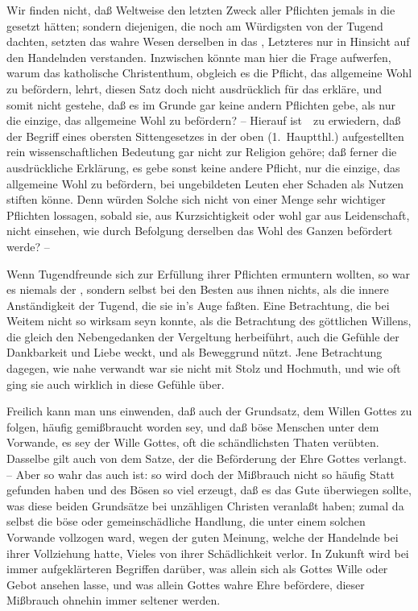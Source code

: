 \begin{aufza}
\item Wir finden nicht, daß  Weltweise den letzten Zweck aller Pflichten jemals in die  gesetzt hätten; sondern diejenigen, die noch am Würdigsten von der Tugend dachten, setzten das wahre Wesen derselben in das , Letzteres nur in Hinsicht auf den Handelnden verstanden. Inzwischen könnte man hier die Frage aufwerfen, warum das katholische Christenthum, obgleich es die Pflicht, das allgemeine Wohl zu befördern, lehrt, diesen Satz doch nicht ausdrücklich für das  erkläre, und somit nicht gestehe, daß es im Grunde gar keine andern Pflichten gebe, als nur die einzige, das allgemeine Wohl zu befördern? -- Hierauf ist~\ zu erwiedern, daß der Begriff eines obersten Sittengesetzes in der oben (1.~Hauptthl.) aufgestellten rein wissenschaftlichen Bedeutung gar nicht zur Religion gehöre; daß ferner die ausdrückliche Erklärung, es gebe sonst keine andere Pflicht, nur die einzige, das allgemeine Wohl zu befördern, bei ungebildeten Leuten eher Schaden als Nutzen stiften könne. Denn würden Solche sich nicht von einer Menge sehr wichtiger Pflichten lossagen, sobald sie, aus Kurzsichtigkeit oder wohl gar aus Leidenschaft, nicht einsehen, wie durch Befolgung derselben das Wohl des Ganzen befördert werde? --
\item Wenn  Tugendfreunde sich zur Erfüllung ihrer Pflichten ermuntern wollten, so war es niemals der , sondern selbst bei den Besten aus ihnen nichts, als die innere Anständigkeit der Tugend, die sie in's Auge faßten. Eine Betrachtung, die bei Weitem nicht so wirksam seyn konnte, als die Betrachtung des göttlichen Willens, die gleich den Nebengedanken der Vergeltung herbeiführt, auch die Gefühle der Dankbarkeit und Liebe weckt, und als Beweggrund nützt. Jene Betrachtung dagegen, wie nahe verwandt war sie nicht mit Stolz und Hochmuth, und wie oft ging sie auch wirklich in diese Gefühle über.\par
Freilich kann man uns einwenden, daß auch der Grundsatz, dem Willen Gottes zu folgen, häufig gemißbraucht worden sey, und daß böse Menschen unter dem Vorwande, es sey der Wille Gottes, oft die schändlichsten Thaten verübten. Dasselbe gilt auch von dem Satze, der die Beförderung der Ehre Gottes verlangt. -- Aber so wahr das auch ist: so wird doch der Mißbrauch nicht so häufig Statt gefunden haben und des Bösen so viel erzeugt, daß es das Gute überwiegen sollte, was diese beiden Grundsätze bei unzähligen Christen veranlaßt haben; zumal da selbst die böse oder gemeinschädliche Handlung, die unter einem solchen Vorwande vollzogen ward, wegen der guten Meinung, welche der Handelnde bei ihrer Vollziehung hatte, Vieles von ihrer Schädlichkeit verlor. In Zukunft wird bei immer aufgeklärteren Begriffen darüber, was allein sich als Gottes Wille oder Gebot ansehen lasse, und was allein Gottes wahre Ehre befördere, dieser Mißbrauch ohnehin immer seltener werden.~

\end{aufza}
